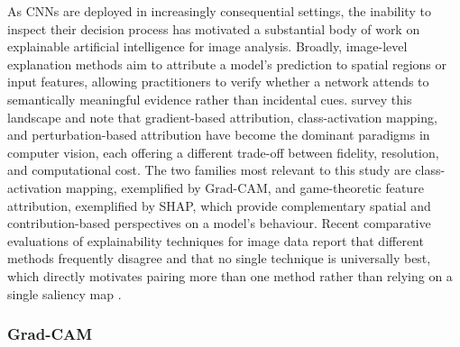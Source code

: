 As CNNs are deployed in increasingly consequential settings, the inability to inspect their decision process has motivated a substantial body of work on explainable artificial intelligence for image analysis.
Broadly, image-level explanation methods aim to attribute a model's prediction to spatial regions or input features, allowing practitioners to verify whether a network attends to semantically meaningful evidence rather than incidental cues.
\citet{nguyen2025xaicv} survey this landscape and note that gradient-based attribution, class-activation mapping, and perturbation-based attribution have become the dominant paradigms in computer vision, each offering a different trade-off between fidelity, resolution, and computational cost.
The two families most relevant to this study are class-activation mapping, exemplified by Grad-CAM, and game-theoretic feature attribution, exemplified by SHAP, which provide complementary spatial and contribution-based perspectives on a model's behaviour.
Recent comparative evaluations of explainability techniques for image data report that different methods frequently disagree and that no single technique is universally best, which directly motivates pairing more than one method rather than relying on a single saliency map \citep{skliarov2025xaicompare}.

\subsubsection{Grad-CAM}
\label{subsubsec:gradcam}

